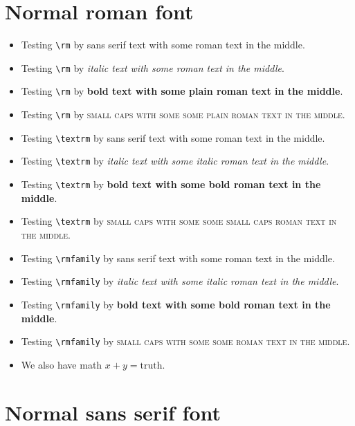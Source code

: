 ﻿\documentclass{article}
\begin{document}
\section{Normal roman font}

\begin{itemize}
\item
Testing \verb#\rm# by \textsf{sans serif text with {\rm some roman text} in the middle}.
\item
Testing \verb#\rm# by \textit{italic text with {\rm some roman text} in the middle}.
\item
Testing \verb#\rm# by \textbf{bold text with {\rm some plain roman text} in the middle}.
\item
Testing \verb#\rm# by \textsc{small caps with some {\rm some plain roman text} in the middle}.
\item
Testing \verb#\textrm# by \textsf{sans serif text with \textrm{some roman text} in the middle}.
\item
Testing \verb#\textrm# by \textit{italic text with \textrm{some italic roman text} in the middle}.
\item
Testing \verb#\textrm# by \textbf{bold text with \textrm{some bold roman text} in the middle}.
\item
Testing \verb#\textrm# by \textsc{small caps with some \textrm{some small caps roman text} in the middle}.
\item
Testing \verb#\rmfamily# by \textsf{sans serif text with {\rmfamily some roman text} in the middle}.
\item
Testing \verb#\rmfamily# by \textit{italic text with {\rmfamily some italic roman text} in the middle}.
\item
Testing \verb#\rmfamily# by \textbf{bold text with {\rmfamily some bold roman text} in the middle}.
\item
Testing \verb#\rmfamily# by \textsc{small caps with some {\rmfamily some roman text} in the middle}.
\item
We also have math $x+y = \mathrm{truth}$.
\end{itemize}

\section{Normal sans serif font}
\end{document}
